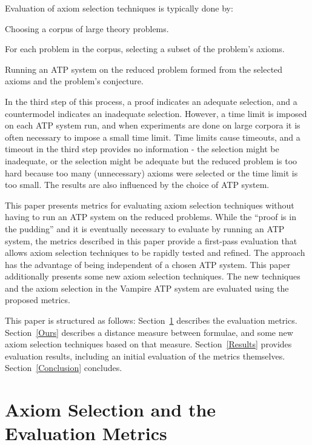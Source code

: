 \documentclass[EPiC]{easychair}
\newenvironment{packed_enumerate}{
\vspace*{-0.5em}
\begin{enumerate}
  \setlength{\partopsep}{0pt}
  \setlength{\itemsep}{1pt}
  \setlength{\parskip}{0pt}
  \setlength{\parsep}{0pt}
}{\end{enumerate}}
\begin{document}
Evaluation of axiom selection techniques is typically done by:
\begin{packed_enumerate}
\item Choosing a corpus of large theory problems.
\item For each problem in the corpus, selecting a subset of the problem's
      axioms.
\item Running an ATP system on the reduced problem formed from the selected 
      axioms and the problem's conjecture.
\end{packed_enumerate}
In the third step of this process, a proof indicates an adequate selection,
and a countermodel indicates an inadequate selection. 
However, a time limit is imposed on each ATP system run, and when experiments 
are done on large corpora it is often necessary to impose a small time limit.
Time limits cause timeouts, and a timeout in the third step provides no 
information - the selection might be inadequate, or the selection might be 
adequate but the reduced problem is too hard because too many (unnecessary) 
axioms were selected or the time limit is too small.
The results are also influenced by the choice of ATP system.

This paper presents metrics for evaluating axiom selection techniques
without having to run an ATP system on the reduced problems.
While the ``proof is in the pudding'' and it is eventually necessary to
evaluate by running an ATP system, the metrics described in this paper
provide a first-pass evaluation that allows axiom selection techniques to
be rapidly tested and refined.
The approach has the advantage of being independent of a chosen ATP system.
This paper additionally presents some new axiom selection techniques. 
The new techniques and the axiom selection in the Vampire \cite{KV13} 
ATP system are evaluated using the proposed metrics.

This paper is structured as follows:
Section~\ref{Metrics} describes the evaluation metrics.
Section~\ref{Ours} describes a distance measure between formulae, and
some new axiom selection techniques based on that measure.
Section~\ref{Results} provides evaluation results, including an initial 
evaluation of the metrics themselves.
Section~\ref{Conclusion} concludes.

\section{Axiom Selection and the Evaluation Metrics}
\label{Metrics}
\end{document}
